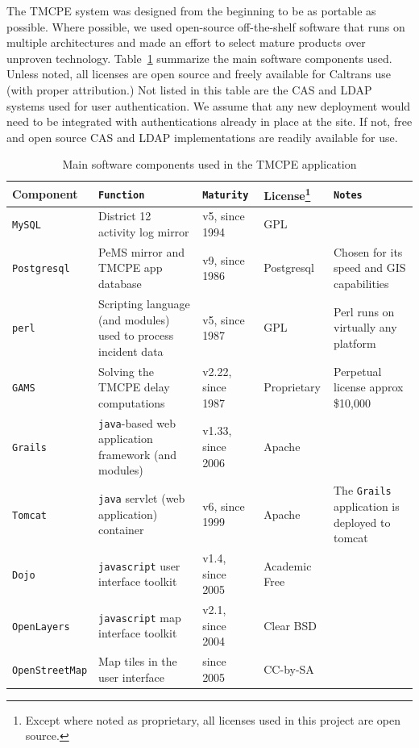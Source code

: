 \documentclass[12pt]{report}
\begin{document}
The \ac{TMCPE} system was designed from the beginning to be as portable as
possible.  Where possible, we used open-source off-the-shelf software that runs
on multiple architectures and made an effort to select mature products over
unproven technology.  Table~\ref{tab:software-components} summarize the main
software components used.  Unless noted, all licenses are open source and freely
available for Caltrans use (with proper attribution.)  Not listed in this table
are the \ac{CAS} and \ac{LDAP} systems used for user authentication.  We assume
that any new deployment would need to be integrated with authentications already
in place at the site.  If not, free and open source \ac{CAS} and \ac{LDAP}
implementations are readily available for use.
\begin{table}
  \centering
  \footnotesize
  \begin{tabularx}{\textwidth}{llllX}
    \hline
    \textbf{Component} & \texttt{Function} & \texttt{Maturity} & License\footnote{Except where noted as proprietary, all licenses used in this project are open source.} & \texttt{Notes} \\
    \hline
    \texttt{MySQL} & District 12 activity log mirror &  v5, since 1994 & GPL & ~ \\
    \texttt{Postgresql} & \ac{PeMS} mirror and \ac{TMCPE} app database & v9, since 1986 & Postgresql & Chosen for its speed and \acs{GIS} capabilities\\
    \texttt{perl} & Scripting language (and modules) used to process incident data & v5, since 1987 & GPL & Perl runs on virtually any platform \\
    \texttt{GAMS} & Solving the \ac{TMCPE} delay computations & v2.22, since 1987 & Proprietary & Perpetual license approx \$10,000 \\
    \texttt{Grails} & \texttt{java}-based web application framework (and modules) & v1.33, since 2006 & Apache & ~ \\
    \texttt{Tomcat} & \texttt{java} servlet (web application) container & v6, since 1999 & Apache & The \texttt{Grails} application is deployed to tomcat \\
    \texttt{Dojo} & \texttt{javascript} user interface toolkit & v1.4, since 2005 & Academic Free & ~ \\
    \texttt{OpenLayers} & \texttt{javascript} map interface toolkit & v2.1, since 2004 & Clear BSD & ~ \\
    \texttt{OpenStreetMap} & Map tiles in the user interface & since 2005 & CC-by-SA & ~ \\
    \hline
  \end{tabularx}
  \caption{Main software components used in the TMCPE application}
  \label{tab:software-components}
\end{table}
\end{document}
